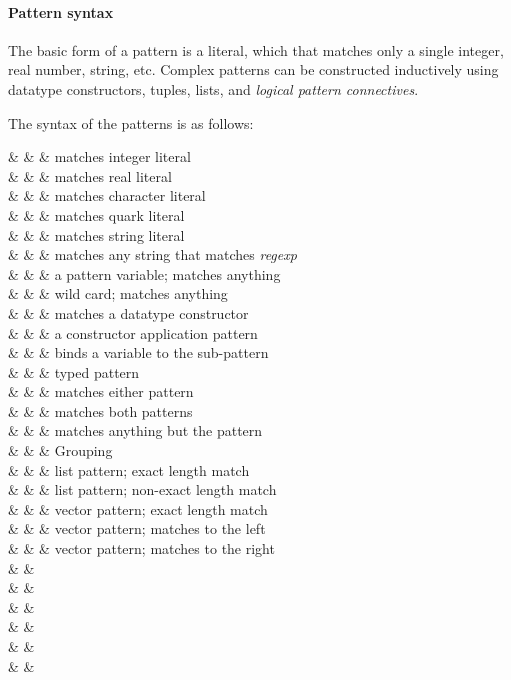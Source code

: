 \paragraph{Pattern syntax}
The basic form of a pattern is a literal, which
that matches only a single integer, real number, string, etc.  Complex
patterns can be constructed inductively
using datatype constructors, tuples, lists, and 
{\em logical pattern connectives}.

The syntax of the patterns is as follows:
\begin{syntax}
 & 
   \IS &  & matches integer literal \\
 & \OR &     & matches real literal \\
 & \OR &     & matches character literal \\
 & \OR &    & matches quark literal \\
 & \OR &   & matches string literal \\
 & \OR &   & matches any string that matches {\em regexp}\\
 & \OR &   & a pattern variable; matches anything \\
 & \OR & \T{\_}      & wild card; matches anything \\
 & \OR &      & matches a datatype constructor  \\
 & \OR &  & a constructor application pattern \\
 & \OR & \Id {} \Pat & binds a variable to the sub-pattern \\
 & \OR & \Pat \T{:} \TypeExp & typed pattern \\
 & \OR & \Pat \T{||} \Pat  & matches either pattern \\
 & \OR & \Pat \T{\&\&} \Pat  & matches both patterns \\
 & \OR & \T{!} \Pat             & matches anything but the pattern \\
 & \OR & \T{(} \Pat \T{)}       & Grouping \\
 & \OR & \T{\#[}  \T{]} & list pattern; exact length match \\
 & \OR & \T{\#[}   \T{]} & list pattern;   
     non-exact length match \\
 & \OR & \T{[|}  \T{|]} & vector pattern; exact length match \\
 & \OR & \T{[|}   \T{|]} 
    & vector pattern; matches to the left \\
 & \OR & \T{[|}   \T{|]} 
    & vector pattern; matches to the right \\
 & \IS & \Pat \\
           & \OR & \T{(}  \T{)} \\
           & \OR & \T{\{}   \T{\}} \\ 
 & \IS & \Id \T{=} \Pat \\
 & \IS & \Id       \\
            & \OR & \Id  \\
\end{syntax}

